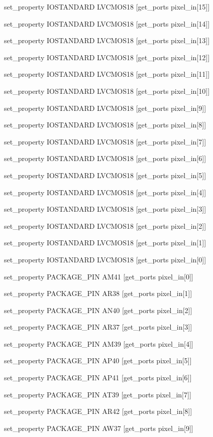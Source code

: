 set\_property IOSTANDARD LVCMOS18 [get\_ports {pixel\_in[15]}]

set\_property IOSTANDARD LVCMOS18 [get\_ports {pixel\_in[14]}]

set\_property IOSTANDARD LVCMOS18 [get\_ports {pixel\_in[13]}]

set\_property IOSTANDARD LVCMOS18 [get\_ports {pixel\_in[12]}]

set\_property IOSTANDARD LVCMOS18 [get\_ports {pixel\_in[11]}]

set\_property IOSTANDARD LVCMOS18 [get\_ports {pixel\_in[10]}]

set\_property IOSTANDARD LVCMOS18 [get\_ports {pixel\_in[9]}]

set\_property IOSTANDARD LVCMOS18 [get\_ports {pixel\_in[8]}]

set\_property IOSTANDARD LVCMOS18 [get\_ports {pixel\_in[7]}]

set\_property IOSTANDARD LVCMOS18 [get\_ports {pixel\_in[6]}]

set\_property IOSTANDARD LVCMOS18 [get\_ports {pixel\_in[5]}]

set\_property IOSTANDARD LVCMOS18 [get\_ports {pixel\_in[4]}]

set\_property IOSTANDARD LVCMOS18 [get\_ports {pixel\_in[3]}]

set\_property IOSTANDARD LVCMOS18 [get\_ports {pixel\_in[2]}]

set\_property IOSTANDARD LVCMOS18 [get\_ports {pixel\_in[1]}]

set\_property IOSTANDARD LVCMOS18 [get\_ports {pixel\_in[0]}]

set\_property PACKAGE\_PIN AM41 [get\_ports {pixel\_in[0]}]

set\_property PACKAGE\_PIN AR38 [get\_ports {pixel\_in[1]}]

set\_property PACKAGE\_PIN AN40 [get\_ports {pixel\_in[2]}]

set\_property PACKAGE\_PIN AR37 [get\_ports {pixel\_in[3]}]

set\_property PACKAGE\_PIN AM39 [get\_ports {pixel\_in[4]}]

set\_property PACKAGE\_PIN AP40 [get\_ports {pixel\_in[5]}]

set\_property PACKAGE\_PIN AP41 [get\_ports {pixel\_in[6]}]

set\_property PACKAGE\_PIN AT39 [get\_ports {pixel\_in[7]}]

set\_property PACKAGE\_PIN AR42 [get\_ports {pixel\_in[8]}]

set\_property PACKAGE\_PIN AW37 [get\_ports {pixel\_in[9]}]

